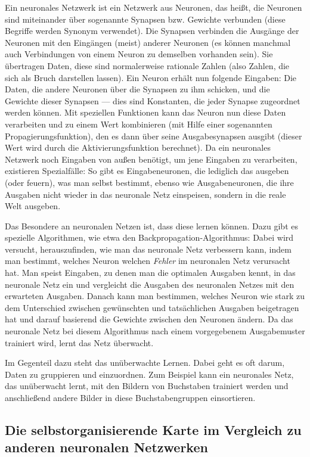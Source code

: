 \documentclass[twoside,a4paper,draft]{article}
\begin{document}
\begin{multicols}{2}
Ein neuronales Netzwerk ist ein Netzwerk aus Neuronen, das heißt, die Neuronen sind miteinander über sogenannte Synapsen bzw. Gewichte verbunden (diese Begriffe werden Synonym verwendet). Die Synapsen verbinden die Ausgänge der Neuronen mit den Eingängen (meist) anderer Neuronen (es können manchmal auch Verbindungen von einem Neuron zu demselben vorhanden sein). Sie übertragen Daten, diese sind normalerweise rationale Zahlen (also Zahlen, die sich als Bruch darstellen lassen). Ein Neuron erhält nun folgende Eingaben: Die Daten, die andere Neuronen über die Synapsen zu ihm schicken, und die \glqq{}Gewichte\grqq{} dieser Synapsen --- dies sind Konstanten, die jeder Synapse zugeordnet werden können. Mit speziellen Funktionen kann das Neuron nun diese Daten verarbeiten und zu einem Wert kombinieren (mit Hilfe einer sogenannten Propagierungsfunktion), den es dann über seine Ausgabesynapsen ausgibt (dieser Wert wird durch die Aktivierungsfunktion berechnet). Da ein neuronales Netzwerk noch Eingaben von außen benötigt, um jene Eingaben zu verarbeiten, existieren Spezialfälle: So gibt es Eingabeneuronen, die lediglich das ausgeben (oder \glqq{}feuern\grqq{}), was man selbst bestimmt, ebenso wie Ausgabeneuronen, die ihre Ausgaben nicht wieder in das neuronale Netz einspeisen, sondern in die reale Welt ausgeben.

Das Besondere an neuronalen Netzen ist, dass diese lernen können. Dazu gibt es spezielle Algorithmen, wie etwa den Backpropagation-Algorithmus: Dabei wird versucht, herauszufinden, wie man das neuronale Netz verbessern kann, indem man bestimmt, welches Neuron welchen \emph{Fehler} im neuronalen Netz verursacht hat. Man speist Eingaben, zu denen man die optimalen Ausgaben kennt, in das neuronale Netz ein und vergleicht die Ausgaben des neuronalen Netzes mit den erwarteten Ausgaben. Danach kann man bestimmen, welches Neuron wie stark zu dem Unterschied zwischen gewünschten und tatsächlichen Ausgaben beigetragen hat und darauf basierend die Gewichte zwischen den Neuronen ändern. Da das neuronale Netz bei diesem Algorithmus nach einem vorgegebenem Ausgabemuster trainiert wird, lernt das Netz \glqq{}überwacht\grqq{}.

Im Gegenteil dazu steht das unüberwachte Lernen. Dabei geht es oft darum, Daten zu gruppieren und einzuordnen. Zum Beispiel kann ein neuronales Netz, das unüberwacht lernt, mit den Bildern von Buchstaben trainiert werden und anschließend andere Bilder in diese Buchstabengruppen einsortieren.

\subsection{Die selbstorganisierende Karte im Vergleich zu anderen neuronalen Netzwerken}


\end{multicols}
\end{document}
